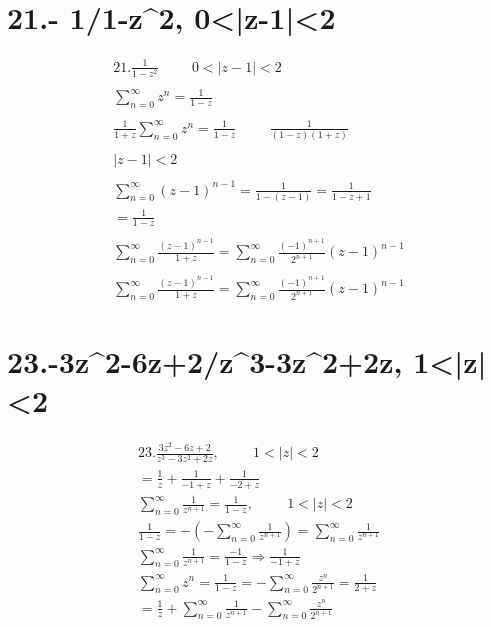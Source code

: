 \documentclass{article}
\begin{document}
\section*{21.- 1/1-z^2, 0<|z-1|<2}
\begin{align*}
21. \frac{1}{1-z^2} \hspace{1cm} 0 < |z-1| < 2 \\
\\
\sum_{n=0}^\infty z^n = \frac{1}{1-z} \\
\\
\frac{1}{1+z} \sum_{n=0}^\infty z^n = \frac{1}{1-z} \hspace{1cm} \frac{1}{(1-z)(1+z)} \\
\\
|z-1| < 2 \\
\\
\sum_{n=0}^\infty (z-1)^{n-1} = \frac{1}{1-(z-1)} = \frac{1}{1-z+1} \\
= \frac{1}{1-z} \\
\\
\sum_{n=0}^\infty \frac{(z-1)^{n-1}}{1+z} = \sum_{n=0}^\infty \frac{(-1)^{n+1}}{2^{n+1}} (z-1)^{n-1} \\
\\
\sum_{n=0}^\infty \frac{(z-1)^{n-1}}{1+z} = \sum_{n=0}^\infty \frac{(-1)^{n+1}}{2^{n+1}} (z-1)^{n-1}
\end{align*}
\section*{23.-3z^2-6z+2/z^3-3z^2+2z, 1<|z|<2}
\begin{align*}
23. \frac{3z^2 - 6z + 2}{z^3 - 3z^2 + 2z}, \hspace{1cm} 1 < |z| < 2 \\
= \frac{1}{z} + \frac{1}{-1 + z} + \frac{1}{-2 + z} \\
\sum_{n=0}^\infty \frac{1}{z^{n+1}} = \frac{1}{1-z}, \hspace{1cm} 1 < |z| < 2 \\
\frac{1}{1-z} = - (-\sum_{n=0}^\infty \frac{1}{z^{n+1}}) = \sum_{n=0}^\infty \frac{1}{z^{n+1}} \\
\sum_{n=0}^\infty \frac{1}{z^{n+1}} = \frac{-1}{1-z} \Rightarrow \frac{1}{-1 + z} \\
\sum_{n=0}^\infty z^n = \frac{1}{1-z} = -\sum_{n=0}^\infty \frac{z^n}{2^{n+1}} = \frac{1}{2+z} \\
= \frac{1}{z} + \sum_{n=0}^\infty \frac{1}{z^{n+1}} - \sum_{n=0}^\infty \frac{z^n}{2^{n+1}}
\end{align*}
\end{document}
